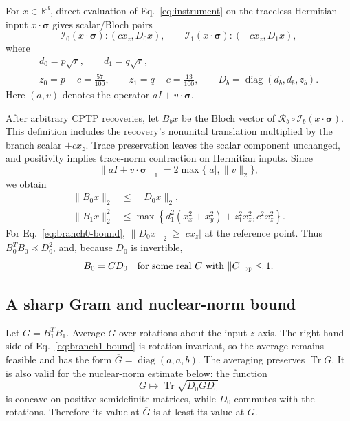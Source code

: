\documentclass[11pt]{article}
\newcommand{\cI}{\mathcal I}
\newcommand{\cR}{\mathcal R}
\newcommand{\Tr}{\operatorname{Tr}}
\newcommand{\diag}{\operatorname{diag}}
\begin{document}
For $x\in\mathbb R^3$, direct evaluation of Eq.~\eqref{eq:instrument} on the
traceless Hermitian input $x\cdot\bm\sigma$ gives scalar/Bloch pairs
\begin{equation}
 \cI_0(x\cdot\bm\sigma): (cx_z,D_0x),\qquad
 \cI_1(x\cdot\bm\sigma): (-cx_z,D_1x),
 \label{eq:branch-pairs}
\end{equation}
where
\begin{equation}
 \begin{gathered}
 d_0=p\sqrt r,\qquad d_1=q\sqrt r,\\
 z_0=p-c=\frac{57}{100},\qquad
 z_1=q-c=\frac{13}{100},\qquad
 D_b=\diag(d_b,d_b,z_b).
 \end{gathered}
 \label{eq:D-definitions}
\end{equation}
Here $(a,v)$ denotes the operator $aI+v\cdot\bm\sigma$.

After arbitrary CPTP recoveries, let $B_bx$ be the Bloch vector of
$\cR_b\circ\cI_b(x\cdot\bm\sigma)$. This definition includes the recovery's
nonunital translation multiplied by the branch scalar $\pm cx_z$. Trace
preservation leaves the scalar component unchanged, and positivity implies
trace-norm contraction on Hermitian inputs. Since
\begin{equation}
 \|aI+v\cdot\bm\sigma\|_1=2\max\{|a|,\|v\|_2\},
 \label{eq:qubit-trace-norm}
\end{equation}
we obtain
\begin{align}
 \|B_0x\|_2&\le \|D_0x\|_2,
 \label{eq:branch0-bound}\\
 \|B_1x\|_2^2&\le
 \max\!\left\{d_1^2(x_x^2+x_y^2)+z_1^2x_z^2,
 c^2x_z^2\right\}.
 \label{eq:branch1-bound}
\end{align}
For Eq.~\eqref{eq:branch0-bound}, $\|D_0x\|_2\ge |cx_z|$ at the
reference point. Thus $B_0^TB_0\preceq D_0^2$, and, because $D_0$ is invertible,
\begin{equation}
 B_0=CD_0\quad\hbox{for some real }C\hbox{ with }\|C\|_{\rm op}\le1.
 \label{eq:douglas}
\end{equation}

\subsection{A sharp Gram and nuclear-norm bound}

Let $G=B_1^TB_1$. Average $G$ over rotations about the input $z$ axis. The
right-hand side of Eq.~\eqref{eq:branch1-bound} is rotation invariant, so the
average remains feasible and has the form
$\overline G=\diag(a,a,b)$. The averaging preserves $\Tr G$. It is also valid
for the nuclear-norm estimate below: the function
\begin{equation}
 G\longmapsto \Tr\sqrt{D_0GD_0}
 \label{eq:concave-functional}
\end{equation}
is concave on positive semidefinite matrices, while $D_0$ commutes with the
rotations. Therefore its value at $\overline G$ is at least its value at $G$.
\end{document}

